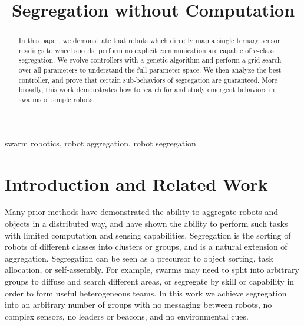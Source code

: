 \documentclass[conference]{IEEEtran}
\begin{document}
\title{Segregation without Computation}

\author{
}

\maketitle

\begin{abstract}
  In this paper, we demonstrate that robots which directly map a single ternary sensor readings to wheel speeds, perform no explicit communication are capable of $n$-class segregation. We evolve controllers with a genetic algorithm and perform a grid search over all parameters to understand the full parameter space. We then analyze the best controller, and prove that certain sub-behaviors of segregation are guaranteed. More broadly, this work demonstrates how to search for and study emergent behaviors in swarms of simple robots.
\end{abstract}

\begin{IEEEkeywords}
  swarm robotics, robot aggregation, robot segregation
\end{IEEEkeywords}

\section{Introduction and Related Work}

  Many prior methods have demonstrated the ability to aggregate robots and objects in a distributed way\cite{shlyakhov_survey_2017}, and \cite{gauci_self-organized_2014}\cite{gauci_clustering_2014} have shown the ability to perform such tasks with limited computation and sensing capabilities. Segregation is the sorting of robots of different classes into clusters or groups, and is a natural extension of aggregation. Segregation can be seen as a precursor to object sorting, task allocation, or self-assembly. For example, swarms may need to split into arbitrary groups to diffuse and search different areas, or segregate by skill or capability in order to form useful heterogeneous teams. In this work we achieve segregation into an arbitrary number of groups with no messaging between robots, no complex sensors, no leaders or beacons, and no environmental cues.
\end{document}
